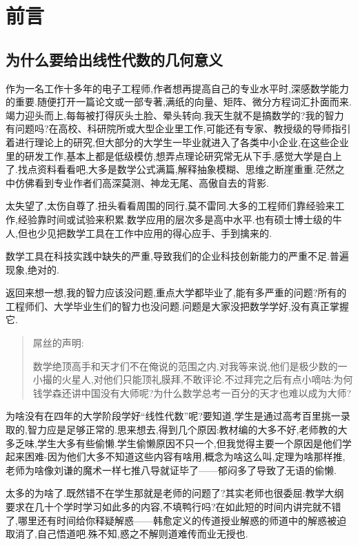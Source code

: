 \chapter*{前言}
\section{为什么要给出线性代数的几何意义}

作为一名工作十多年的电子工程师,作者想再提高自己的专业水平时,深感数学能力的重要.随便打开一篇论文或一部专著,满纸的向量、矩阵、微分方程词汇扑面而来.竭力迎头而上,每每被打得灰头土脸、晕头转向.我天生就不是搞数学的?我的智力有问题吗?在高校、科研院所或大型企业里工作,可能还有专家、教授级的导师指引着进行理论上的研究,但大部分的大学生一毕业就进入了各类中小企业,在这些企业里的研发工作,基本上都是低级模仿,想弄点理论研究常无从下手,感觉大学是白上了.找点资料看看吧,大多是数学公式满篇,解释抽象模糊、思维之断崖重重.茫然之中仿佛看到专业作者们高深莫测、神龙无尾、高傲自去的背影.

太失望了,太伤自尊了.扭头看看周围的同行,莫不雷同.大多的工程师们靠经验来工作,经验靠时间或试验来积累.数学应用的层次多是高中水平.也有硕士博士级的牛人,但也少见把数学工具在工作中应用的得心应手、手到擒来的.

数学工具在科技实践中缺失的严重,导致我们的企业科技创新能力的严重不足.普遍现象,绝对的.

返回来想一想,我的智力应该没问题,重点大学都毕业了,能有多严重的问题?所有的工程师们、大学毕业生们的智力也没问题.问题是大家没把数学学好,没有真正掌握它.

\begin{quote}
屌丝的声明:

数学绝顶高手和天才们不在俺说的范围之内,对我等来说,他们是极少数的一小撮的火星人,对他们只能顶礼膜拜,不敢评论.不过拜完之后有点小嘀咕:为何钱学森还讲中国没有大师呢?为什么数学总考一百分的天才也难以成为大师?
\end{quote}

为啥没有在四年的大学阶段学好``线性代数''呢?要知道,学生是通过高考百里挑一录取的,智力应是足够正常的.思来想去,得到几个原因:教材编的大多不好,老师教的大多乏味,学生大多有些偷懒.学生偷懒原因不只一个,但我觉得主要一个原因是他们学起来困难-因为他们大多不知道这些内容有啥用,概念为啥这么叫,定理为啥那样推,老师为啥像刘谦的魔术一样七推八导就证毕了------郁闷多了导致了无语的偷懒.

太多的为啥了.既然错不在学生那就是老师的问题了?其实老师也很委屈:教学大纲要求在几十个学时学习如此多的内容,不填鸭行吗?在如此短的时间内讲完就不错了,哪里还有时间给你释疑解惑------韩愈定义的传道授业解惑的师道中的解惑被迫取消了,自己悟道吧.殊不知,惑之不解则道难传而业无授也.

